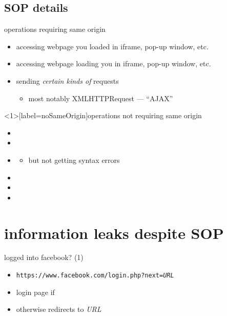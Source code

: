 
\subsection{SOP details}

\begin{frame}{operations requiring same origin}
    \begin{itemize}
    \item accessing webpage you loaded in iframe, pop-up window, etc.
    \item accessing webpage loading you in iframe, pop-up window, etc.
    \item sending \textit{certain kinds of} requests
        \begin{itemize}
        \item most notably XMLHTTPRequest --- ``AJAX''
        \end{itemize}
    \end{itemize}
\end{frame}

\begin{frame}<1>[label=noSameOrigin]{operations not requiring same origin}
    \begin{itemize}
    \item {}
    \item {}
    \item {}
        \begin{itemize}
        \item but not getting syntax errors
        \end{itemize}
    \item {}
    \item {}
    \item {}
    \end{itemize}
\end{frame}


\section{information leaks despite SOP}


\begin{frame}[fragile,label=inFB]{logged into facebook? (1)}
    \begin{itemize}
        \item \texttt{https://www.facebook.com/login.php?next=\textit{URL}}
        \item login page if 
            \item otherwise redirects to \textit{URL}
    \end{itemize}
\end{frame}

